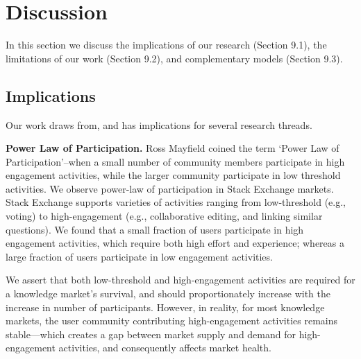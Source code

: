 \section{Discussion}
In this section we discuss the implications of our research (Section 9.1), the limitations of our work (Section 9.2), and  complementary models (Section 9.3).

\subsection{Implications}
Our work draws from, and has implications for several research threads.

\textbf{Power Law of Participation.} Ross Mayfield coined the term \lq Power Law of Participation\rq\---when a small number of community members participate in high engagement activities, while the larger community participate in low threshold activities. We observe power-law of participation in Stack Exchange markets. Stack Exchange supports varieties of activities ranging from low-threshold (e.g., voting) to high-engagement (e.g., collaborative editing, and linking similar questions). We found that a small fraction of users participate in high engagement activities, which require both high effort and experience; whereas a large fraction of users participate in low engagement activities. 

We assert that both low-threshold and high-engagement activities are required for a knowledge market's survival, and should proportionately increase with the increase in number of participants. However, in reality, for most knowledge markets, the user community contributing high-engagement activities remains stable---which creates a gap between market supply and demand for high-engagement activities, and consequently affects market health. 




